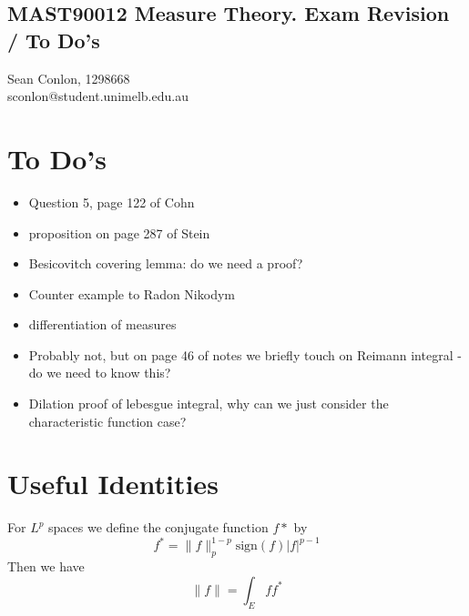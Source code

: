 \documentclass[nocolor]{report}
\begin{document}
    \newpage
    \subsection*{\centering MAST90012 Measure Theory. Exam Revision / To Do's}
\begin{center}
    Sean Conlon, 1298668 \\
    sconlon@student.unimelb.edu.au
\end{center}


\section*{To Do's}
\begin{itemize}
    \item Question 5, page 122 of Cohn
    \item proposition on page 287 of Stein
    \item Besicovitch covering lemma: do we need a proof?
    \item Counter example to Radon Nikodym
    \item differentiation of measures
    \item Probably not, but on page 46 of notes we briefly touch on Reimann integral - do we need to know this?
    \item Dilation proof of lebesgue integral, why can we just consider the characteristic function case?
\end{itemize}



\newpage
\section*{Useful Identities}

For $L^p$ spaces we define the conjugate function $f*$ by 
$$f^* = \|f\|_p^{1-p}\text{sign}(f)|f|^{p-1}$$
Then we have 
$$\|f\| = \int_E ff^*$$
\end{document}
